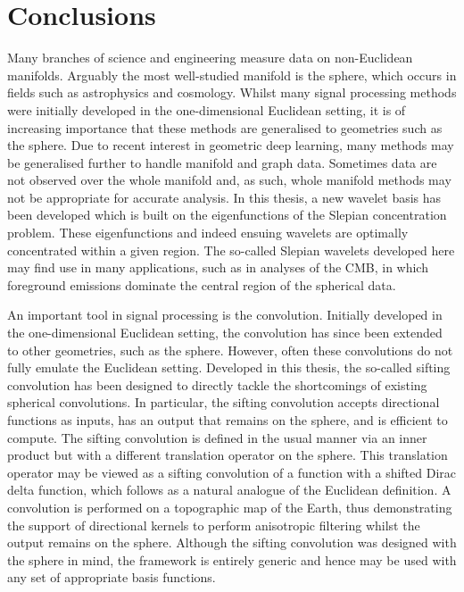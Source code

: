 \chapter{Conclusions}\label{sec:chapter6}

Many branches of science and engineering measure data on non-Euclidean manifolds.
Arguably the most well-studied manifold is the sphere, which occurs in fields such as astrophysics and cosmology.
Whilst many signal processing methods were initially developed in the one-dimensional Euclidean setting, it is of increasing importance that these methods are generalised to geometries such as the sphere.
Due to recent interest in geometric deep learning, many methods may be generalised further to handle manifold and graph data.
Sometimes data are not observed over the whole manifold and, as such, whole manifold methods may not be appropriate for accurate analysis.
In this thesis, a new wavelet basis has been developed which is built on the eigenfunctions of the Slepian concentration problem.
These eigenfunctions and indeed ensuing wavelets are optimally concentrated within a given region.
The so-called Slepian wavelets developed here may find use in many applications, such as in analyses of the CMB, in which foreground emissions dominate the central region of the spherical data.

An important tool in signal processing is the convolution.
Initially developed in the one-dimensional Euclidean setting, the convolution has since been extended to other geometries, such as the sphere.
However, often these convolutions do not fully emulate the Euclidean setting.
Developed in this thesis, the so-called sifting convolution has been designed to directly tackle the shortcomings of existing spherical convolutions.
In particular, the sifting convolution accepts directional functions as inputs, has an output that remains on the sphere, and is efficient to compute.
The sifting convolution is defined in the usual manner via an inner product but with a different translation operator on the sphere.
This translation operator may be viewed as a sifting convolution of a function with a shifted Dirac delta function, which follows as a natural analogue of the Euclidean definition.
A convolution is performed on a topographic map of the Earth, thus demonstrating the support of directional kernels to perform anisotropic filtering whilst the output remains on the sphere.
Although the sifting convolution was designed with the sphere in mind, the framework is entirely generic and hence may be used with any set of appropriate basis functions.


